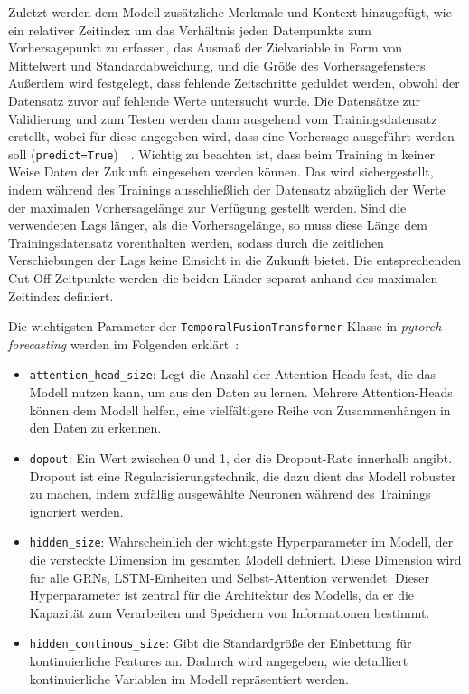 Zuletzt werden dem Modell zusätzliche Merkmale und Kontext hinzugefügt, wie ein relativer Zeitindex um das Verhältnis jeden Datenpunkts zum Vorhersagepunkt zu erfassen, das Ausmaß der Zielvariable in Form von Mittelwert und Standardabweichung, und die Größe des Vorhersagefensters.
Außerdem wird festgelegt, dass fehlende Zeitschritte geduldet werden, obwohl der Datensatz zuvor auf fehlende Werte untersucht wurde.
Die Datensätze zur Validierung und zum Testen werden dann ausgehend vom Trainingsdatensatz erstellt, wobei für diese angegeben wird, dass eine Vorhersage ausgeführt werden soll (\lstinline[columns=fixed]{predict=True})~\cite{Labiadh.2023}~\cite{GitHub.20240307T20:56:16.000Z}.
Wichtig zu beachten ist, dass beim Training in keiner Weise Daten der Zukunft eingesehen werden können.
Das wird sichergestellt, indem während des Trainings ausschließlich der Datensatz abzüglich der Werte der maximalen Vorhersagelänge zur Verfügung gestellt werden.
Sind die verwendeten Lags länger, als die Vorhersagelänge, so muss diese Länge dem Trainingsdatensatz vorenthalten werden, sodass durch die zeitlichen Verschiebungen der Lags keine Einsicht in die Zukunft bietet.
Die entsprechenden Cut-Off-Zeitpunkte werden die beiden Länder separat anhand des maximalen Zeitindex definiert.

Die wichtigsten Parameter der \lstinline[columns=fixed]{TemporalFusionTransformer}-Klasse in \textit{pytorch forecasting} werden im Folgenden erklärt~\cite{Joseph.2022}:
\begin{itemize}
  \item \lstinline[columns=fixed]{attention_head_size}: Legt die Anzahl der Attention-Heads fest, die das Modell  nutzen kann, um aus den Daten zu lernen.
 Mehrere Attention-Heads können dem Modell helfen, eine vielfältigere Reihe von Zusammenhängen in den Daten zu erkennen.
  \item \lstinline[columns=fixed]{dopout}: Ein Wert zwischen 0 und 1, der die Dropout-Rate innerhalb angibt.
  Dropout ist eine Regularisierungstechnik, die dazu dient das Modell robuster zu machen, indem zufällig ausgewählte Neuronen während des Trainings ignoriert werden.
  \item \lstinline[columns=fixed]{hidden_size}: Wahrscheinlich der wichtigste Hyperparameter im Modell, der die versteckte Dimension im gesamten Modell definiert.
 Diese Dimension wird für alle \acp{GRN}, \ac{LSTM}-Einheiten und Selbst-Attention verwendet.
 Dieser Hyperparameter ist zentral für die Architektur des Modells, da er die Kapazität zum Verarbeiten und Speichern von Informationen bestimmt.
 \item \lstinline[columns=fixed]{hidden_continous_size}: Gibt die Standardgröße der Einbettung für kontinuierliche Features an.
 Dadurch wird angegeben, wie detailliert kontinuierliche Variablen im Modell repräsentiert werden.
 \end{itemize}

